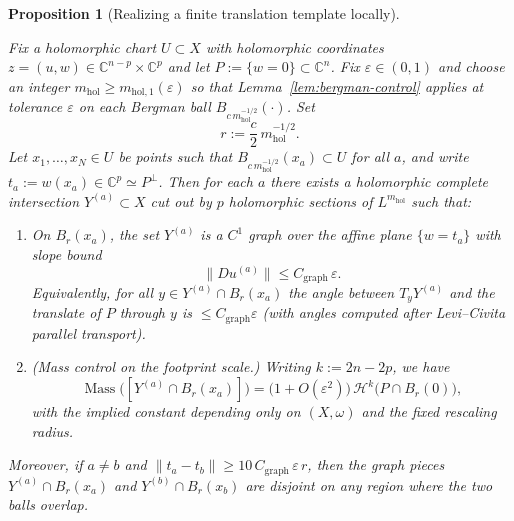 \documentclass[11pt]{article}
\numberwithin{equation}{section}  %
\theoremstyle{plain}
\newtheorem{proposition}[theorem]{Proposition}
\theoremstyle{definition}
\theoremstyle{remark}
\newcommand{\C}{\mathbb{C}}
\newcommand{\mhol}{m_{\mathrm{hol}}} %
\DeclareMathOperator{\Mass}{Mass}
\begin{document}
\begin{proposition}[Realizing a finite translation template locally]\label{prop:finite-template}

Fix a holomorphic chart $U\subset X$ with holomorphic coordinates $z=(u,w)\in\C^{n-p}\times\C^p$ and let
$P:=\{w=0\}\subset\C^n$.
Fix $\varepsilon\in(0,1)$ and choose an integer $\mhol\ge m_{\mathrm{hol},1}(\varepsilon)$ so that
Lemma~\ref{lem:bergman-control} applies at tolerance $\varepsilon$ on each Bergman ball $B_{c\,\mhol^{-1/2}}(\cdot)$.
Set
\[
r:=\frac{c}{2}\,\mhol^{-1/2}.
\]
Let $x_1,\dots,x_N\in U$ be points such that $B_{c\,\mhol^{-1/2}}(x_a)\subset U$ for all $a$, and write
$t_a:=w(x_a)\in\C^p\simeq P^\perp$.  Then for each $a$ there exists a holomorphic complete intersection
\(
Y^{(a)}\subset X
\)
cut out by $p$ holomorphic sections of $L^{\mhol}$ such that:
\begin{enumerate}
\item[(i)] On $B_r(x_a)$, the set $Y^{(a)}$ is a $C^1$ graph over the affine plane $\{w=t_a\}$ with slope bound
\[
\|D u^{(a)}\|\le C_{\mathrm{graph}}\,\varepsilon .
\]
Equivalently, for all $y\in Y^{(a)}\cap B_r(x_a)$ the angle between $T_yY^{(a)}$ and the translate of $P$
through $y$ is $\le C_{\mathrm{graph}}\varepsilon$ (with angles computed after Levi--Civita parallel transport).
\item[(ii)] (Mass control on the footprint scale.) Writing $k:=2n-2p$, we have
\[
\Mass\!\bigl([Y^{(a)}\cap B_r(x_a)]\bigr)
=\bigl(1+O(\varepsilon^2)\bigr)\,\mathcal{H}^{k}\!\bigl(P\cap B_r(0)\bigr),
\]
with the implied constant depending only on $(X,\omega)$ and the fixed rescaling radius.
\end{enumerate}
Moreover, if $a\neq b$ and $\|t_a-t_b\|\ge 10\,C_{\mathrm{graph}}\,\varepsilon\,r$, then the graph pieces
$Y^{(a)}\cap B_r(x_a)$ and $Y^{(b)}\cap B_r(x_b)$ are disjoint on any region where the two balls overlap.

\end{proposition}
\end{document}
